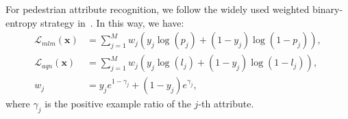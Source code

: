 \documentclass[runningheads]{llncs}
\begin{document}
For pedestrian attribute recognition, we follow the widely used
weighted binary-entropy strategy in~\cite{jia2021spatial,tang2019improving}. In this way, we have:
\begin{equation}
\label{equ:loss:weight}
  \begin{split}
  \mathcal{L}_{mlm}(\bm{x}) \!\!&=\!\!\sum_{j=1}^{M} \!w_{j}(y_{j} \!\log(p_{j}) \!+\! (1 \!-\! y_{j}) \!\log(1\!-\!p_{j} )),  \\
   \mathcal{L}_{aqn}(\bm{x}) \!\!&=\!\!\sum_{j=1}^{M} \!w_{j}(y_{j} \!\log(l_{j}) \!+\! (1 \!-\! y_{j}) \!\log(1\!-\!l_{j} )), \\
   w_{j} &= y_{j} e^{1- \gamma_j} + (1 -  y_{j} )e^{\gamma_j},
  \end{split}
\end{equation}
where $\gamma_j$ is the positive example ratio of the $j$-th attribute.
\end{document}

